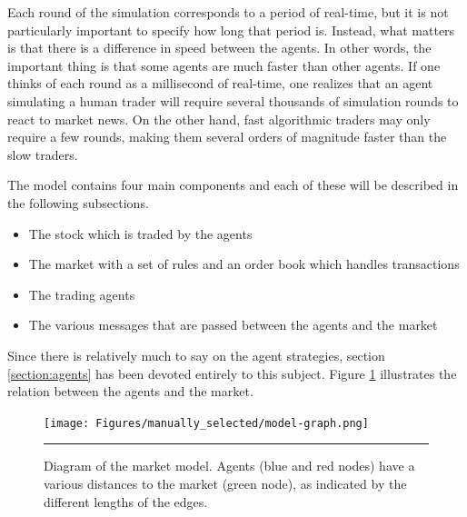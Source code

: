 Each round of the simulation corresponds to a period of real-time, but it is not particularly important to specify how long that period is. Instead, what matters is that there is a difference in speed between the agents. In other words, the important thing is that some agents are much faster than other agents. If one thinks of each round as a millisecond of real-time, one realizes that an agent simulating a human trader will require several thousands of simulation rounds to react to market news. On the other hand, fast algorithmic traders may only require a few rounds, making them several orders of magnitude faster than the slow traders. 

The model contains four main components and each of these will be described in the following subsections. 
\begin{itemize}
\item The stock which is traded by the agents
\item The market with a set of rules and an order book which handles transactions
\item The trading agents
\item The various messages that are passed between the agents and the market
\end{itemize}
Since there is relatively much to say on the agent strategies, section \ref{section:agents} has been devoted entirely to this subject.
Figure \ref{fig:agents_and_market} illustrates the relation between the agents and the market. 
\begin{figure}[htbp]
	\centering
		\texttt{[image: Figures/manually\_selected/model-graph.png]}
		\rule{35em}{0.5pt}
	\caption{Diagram of the market model. Agents (blue and red nodes) have a various distances to the market (green node), as indicated by the different lengths of the edges.}
	\label{fig:agents_and_market}
\end{figure}


